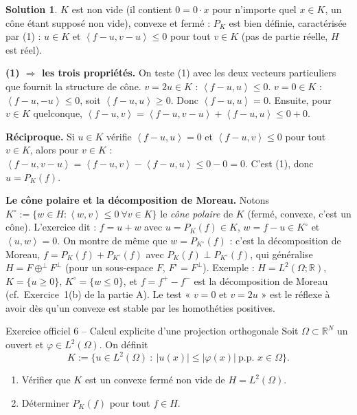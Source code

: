 \documentclass[11pt,a4paper]{article}
\newcommand{\R}{\mathbb{R}}
\newcommand{\ps}[2]{\left\langle #1,#2\right\rangle}
\theoremstyle{definition}
\newtheorem*{solution}{Solution}
\begin{document}
\begin{solution}
$K$ est non vide (il contient $0=0\cdot x$ pour n'importe quel $x\in K$, un cône étant supposé non vide), convexe et fermé : $P_K$ est bien définie, caractérisée par (1) : $u\in K$ et $\ps{f-u}{v-u}\le0$ pour tout $v\in K$ (pas de partie réelle, $H$ est réel).

\medskip
\noindent\textbf{(1) $\Rightarrow$ les trois propriétés.} On teste (1) avec les deux vecteurs particuliers que fournit la structure de cône. \emph{$v=2u\in K$} : $\ps{f-u}{u}\le0$. \emph{$v=0\in K$} : $\ps{f-u}{-u}\le0$, soit $\ps{f-u}u\ge0$. Donc $\ps{f-u}u=0$. Ensuite, pour $v\in K$ quelconque, $\ps{f-u}v=\ps{f-u}{v-u}+\ps{f-u}u\le0+0$.

\medskip
\noindent\textbf{Réciproque.} Si $u\in K$ vérifie $\ps{f-u}u=0$ et $\ps{f-u}v\le0$ pour tout $v\in K$, alors pour $v\in K$ : $\ps{f-u}{v-u}=\ps{f-u}v-\ps{f-u}u\le0-0=0$. C'est (1), donc $u=P_K(f)$.
\end{solution}

\begin{pointcle}
\textbf{Le cône polaire et la décomposition de Moreau.} Notons $K^\circ:=\{w\in H:\ps wv\le0\ \forall v\in K\}$ le \emph{cône polaire} de $K$ (fermé, convexe, c'est un cône). L'exercice dit : $f=u+w$ avec $u=P_K(f)\in K$, $w=f-u\in K^\circ$ et $\ps uw=0$. On montre de même que $w=P_{K^\circ}(f)$ : c'est la décomposition de Moreau, $f=P_K(f)+P_{K^\circ}(f)$ avec $P_K(f)\perp P_{K^\circ}(f)$, qui généralise $H=F\oplus^\perp F^\perp$ (pour un sous-espace $F$, $F^\circ=F^\perp$). Exemple : $H=L^2(\Omega;\R)$, $K=\{u\ge0\}$, $K^\circ=\{w\le0\}$, et $f=f^+-f^-$ est la décomposition de Moreau (cf.\ Exercice~1(b) de la partie A). Le test « $v=0$ et $v=2u$ » est le réflexe à avoir dès qu'un convexe est stable par les homothéties positives.
\end{pointcle}

\begin{exo}{Exercice officiel 6 -- Calcul explicite d'une projection orthogonale}
Soit $\Omega\subset\R^N$ un ouvert et $\varphi\in L^2(\Omega)$. On définit
\[
K:=\{u\in L^2(\Omega)\ :\ |u(x)|\le|\varphi(x)|\ \text{p.p.\ }x\in\Omega\}.
\]
\begin{enumerate}[label=(\alph*)]
  \item Vérifier que $K$ est un convexe fermé non vide de $H=L^2(\Omega)$.
  \item Déterminer $P_K(f)$ pour tout $f\in H$.
\end{enumerate}
\end{exo}
\end{document}

